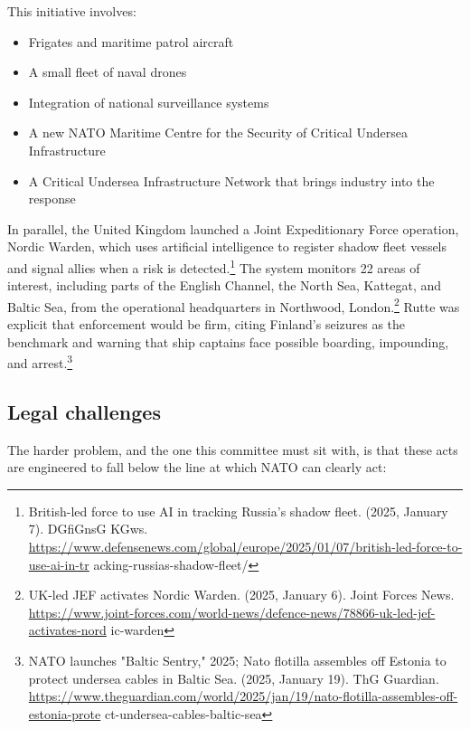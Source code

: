 This initiative involves:

\begin{itemize}
  \item Frigates and maritime patrol aircraft
  \item A small fleet of naval drones
  \item Integration of national surveillance systems
  \item A new NATO Maritime Centre for the Security of Critical Undersea Infrastructure
  \item A Critical Undersea Infrastructure Network that brings industry into the response
\end{itemize}

In parallel, the United Kingdom launched a Joint Expeditionary Force operation, Nordic Warden, which uses artificial intelligence to register shadow fleet vessels and signal allies when a risk is detected.\footnote{British-led force to use AI in tracking Russia's shadow fleet. (2025, January 7). DGfiGnsG KGws. \url{https://www.defensenews.com/global/europe/2025/01/07/british-led-force-to-use-ai-in-tr} acking-russias-shadow-fleet/} The system monitors 22 areas of interest, including parts of the English Channel, the North Sea, Kattegat, and Baltic Sea, from the operational headquarters in Northwood, London.\footnote{UK-led JEF activates Nordic Warden. (2025, January 6). Joint Forces News. \url{https://www.joint-forces.com/world-news/defence-news/78866-uk-led-jef-activates-nord} ic-warden} Rutte was explicit that enforcement would be firm, citing Finland's seizures as the benchmark and warning that ship captains face possible boarding, impounding, and arrest.\footnote{NATO launches "Baltic Sentry," 2025; Nato flotilla assembles off Estonia to protect undersea cables in Baltic Sea. (2025, January 19). ThG Guardian. \url{https://www.theguardian.com/world/2025/jan/19/nato-flotilla-assembles-off-estonia-prote} ct-undersea-cables-baltic-sea}

\subsection{Legal challenges}

The harder problem, and the one this committee must sit with, is that these acts are engineered to fall below the line at which NATO can clearly act:

